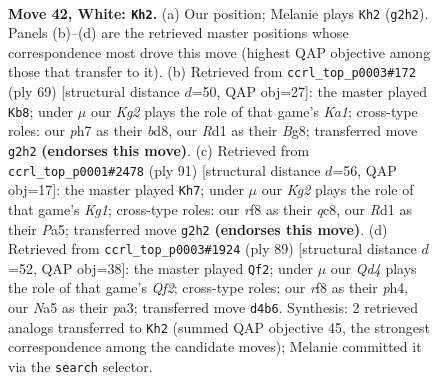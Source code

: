 \documentclass[11pt]{article}
\begin{document}
\clearpage

\begin{figure}[p]\centering
\begin{subfigure}{0.46\textwidth}\centering
\resizebox{\linewidth}{!}{%
\newchessgame
\chessboard[
  setfen={5rk1/6rp/8/Np5P/3Q2P1/8/PP3PK1/3R4 w - - 1 42},
  showmover=false,
  pgfstyle=straightmove, color=movearrow, markmove={g2-h2}
]}
\caption{}
\end{subfigure}\hfill
\begin{subfigure}{0.46\textwidth}\centering
\resizebox{\linewidth}{!}{%
\newchessgame
\chessboard[
  setfen={k2B2b1/np3p2/2q1p2p/8/3p4/8/5PPP/R1R3K1 b - - 1 35},
  showmover=false,
  pgfstyle=straightmove, color=movearrow, markmove={a8-b8}
]}
\caption{}
\end{subfigure}
\\[4pt]
\begin{subfigure}{0.46\textwidth}\centering
\resizebox{\linewidth}{!}{%
\newchessgame
\chessboard[
  setfen={2Q3k1/6p1/2p2q2/p1p5/2Pp4/3P4/r6P/6RK b - - 3 46},
  showmover=false,
  pgfstyle=straightmove, color=movearrow, markmove={g8-h7}
]}
\caption{}
\end{subfigure}\hfill
\begin{subfigure}{0.46\textwidth}\centering
\resizebox{\linewidth}{!}{%
\newchessgame
\chessboard[
  setfen={8/pp3q2/3R2pk/3R3p/7P/P7/1P6/K7 b - - 12 45},
  showmover=false,
  pgfstyle=straightmove, color=movearrow, markmove={f7-f2}
]}
\caption{}
\end{subfigure}
\caption{\textbf{Move 42, White: \texttt{Kh2}.} (a) Our position; Melanie plays \texttt{Kh2} (\texttt{g2h2}). Panels (b)--(d) are the retrieved master positions whose correspondence most drove this move (highest QAP objective among those that transfer to it). (b) Retrieved from \texttt{ccrl\_top\_p0003\#172} (ply 69) [structural distance $d$=50, QAP obj=27]: the master played \texttt{Kb8}; under $\mu$ our \emph{Kg2} plays the role of that game's \emph{Ka1}; cross-type roles: our \emph{p}h7 as their \emph{b}d8, our \emph{R}d1 as their \emph{B}g8; transferred move \texttt{g2h2} \textbf{(endorses this move)}. (c) Retrieved from \texttt{ccrl\_top\_p0001\#2478} (ply 91) [structural distance $d$=56, QAP obj=17]: the master played \texttt{Kh7}; under $\mu$ our \emph{Kg2} plays the role of that game's \emph{Kg1}; cross-type roles: our \emph{r}f8 as their \emph{q}c8, our \emph{R}d1 as their \emph{P}a5; transferred move \texttt{g2h2} \textbf{(endorses this move)}. (d) Retrieved from \texttt{ccrl\_top\_p0003\#1924} (ply 89) [structural distance $d$=52, QAP obj=38]: the master played \texttt{Qf2}; under $\mu$ our \emph{Qd4} plays the role of that game's \emph{Qf2}; cross-type roles: our \emph{r}f8 as their \emph{p}h4, our \emph{N}a5 as their \emph{p}a3; transferred move \texttt{d4b6}. Synthesis: 2 retrieved analogs transferred to \texttt{Kh2} (summed QAP objective 45, the strongest correspondence among the candidate moves); Melanie committed it via the \texttt{search} selector.}
\label{fig:thought-m82}
\end{figure}
\end{document}
